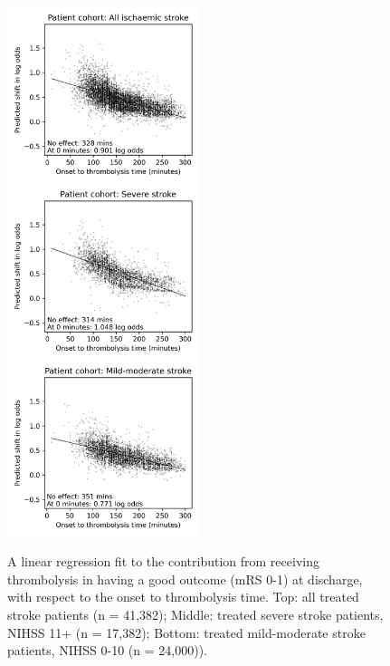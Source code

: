 \begin{figure}[h]
    \centering
    \includegraphics[width=0.50\textwidth]{./images/p3_regression}\\
    \caption{A linear regression fit to the contribution from receiving thrombolysis in having a good outcome (mRS 0-1) at discharge, with respect to the onset to thrombolysis time. Top: all treated stroke patients (n = 41,382); Middle: treated severe stroke patients, NIHSS 11+ (n = 17,382); Bottom: treated mild-moderate stroke patients, NIHSS 0-10 (n = 24,000)).}
    \label{fig:linear_regression_plots}
\end{figure}

